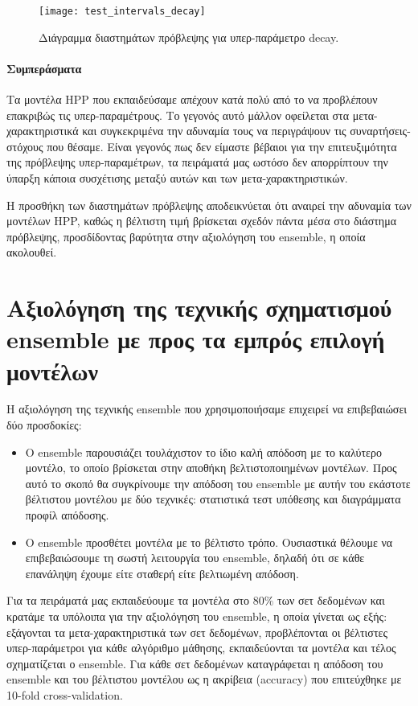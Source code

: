 \begin{figure}[!htb]
	\texttt{[image: test\_intervals\_decay]}
	\caption[Διάγραμμα διαστημάτων πρόβλεψης για υπερ-παράμετρο decay]{Διάγραμμα διαστημάτων πρόβλεψης για υπερ-παράμετρο decay.}	
	\label{fig:high} 
\end{figure}
\FloatBarrier

\paragraph{Συμπεράσματα}
Τα μοντέλα HPP που εκπαιδεύσαμε απέχουν κατά πολύ από το να προβλέπουν επακριβώς τις υπερ-παραμέτρους. Το γεγονός αυτό μάλλον οφείλεται στα μετα-χαρακτη\-ρι\-στικά και συγκεκριμένα την αδυναμία τους να περιγράψουν τις συναρτήσεις-στόχους που θέσαμε. Είναι γεγονός πως δεν είμαστε βέβαιοι για την επιτευξιμότητα της πρόβλεψης υπερ-παραμέτρων, τα πειράματά μας ωστόσο δεν απορρίπτουν την ύπαρξη κάποια συσχέτισης μεταξύ αυτών και των μετα-χαρακτηριστικών.

Η προσθήκη των διαστημάτων πρόβλεψης αποδεικνύεται ότι αναιρεί την αδυναμία των μοντέλων HPP, καθώς η βέλτιστη τιμή βρίσκεται σχεδόν πάντα μέσα στο διάστημα πρόβλεψης, προσδίδοντας βαρύτητα στην αξιολόγηση του ensemble, η οποία ακολουθεί.  
\section{Αξιολόγηση της τεχνικής σχηματισμού ensemble με προς τα εμπρός επιλογή μοντέλων} \label{section:tensemble}
H αξιολόγηση της τεχνικής ensemble που χρησιμοποιήσαμε επιχειρεί να επιβεβαιώσει δύο προσδοκίες:
\begin{itemize}
	\item Ο ensemble παρουσιάζει τουλάχιστον το ίδιο καλή απόδοση με το καλύτερο μοντέλο, το οποίο βρίσκεται στην αποθήκη βελτιστοποιημένων μοντέλων. Προς αυτό το σκοπό θα συγκρίνουμε την απόδοση του ensemble με αυτήν του εκάστοτε βέλτιστου μοντέλου με δύο τεχνικές: στατιστικά τεστ υπόθεσης και διαγράμματα προφίλ απόδοσης.
	\item Ο ensemble προσθέτει μοντέλα με το βέλτιστο τρόπο. Ουσιαστικά θέλουμε να επιβεβαιώσουμε τη σωστή λειτουργία του ensemble, δηλαδή ότι σε κάθε επανάληψη έχουμε είτε σταθερή είτε βελτιωμένη απόδοση.
\end{itemize}

Για τα πειράματά μας εκπαιδεύουμε τα μοντέλα στο $80\%$ των σετ δεδομένων και κρατάμε τα υπόλοιπα για την αξιολόγηση του ensemble, η οποία γίνεται ως εξής: εξάγονται τα μετα-χαρακτηριστικά των σετ δεδομένων, προβλέπονται οι βέλτιστες υπερ-παράμετροι για κάθε αλγόριθμο μάθησης, εκπαιδεύονται τα μοντέλα και τέλος σχηματίζεται ο ensemble. Για κάθε σετ δεδομένων καταγράφεται η απόδοση του ensemble και του βέλτιστου μοντέλου ως η ακρίβεια (accuracy) που επιτεύχθηκε με 10-fold cross-validation. 

